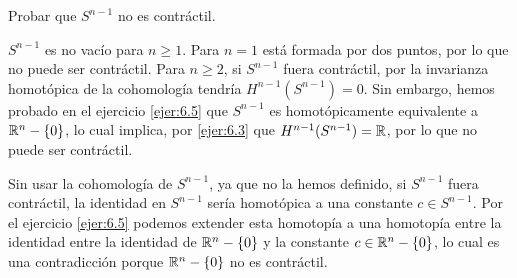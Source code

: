 \documentclass[twoside]{article}
\begin{document}
\begin{ejercicio}{6.6}
Probar que $S^{n-1}$ no es contráctil.
\end{ejercicio}
\begin{solucion}
$S^{n-1}$ es no vacío para $n\geq 1$. Para $n=1$ está formada por dos puntos, por lo que no puede ser contráctil. Para $n\geq 2$, si $S^{n-1}$ fuera contráctil, por la invarianza homotópica de la cohomología tendría $H^{n-1}(S^{n-1})=0$. Sin embargo, hemos probado en el ejercicio \ref{ejer:6.5} que $S^{n-1}$ es homotópicamente equivalente a $\mathbb{R}^n-\{0\}$, lo cual implica, por \ref{ejer:6.3} que $H^{n-1}(S^{n-1})=\mathbb{R}$, por lo que no puede ser contráctil.

Sin usar la cohomología de $S^{n-1}$, ya que no la hemos definido, si $S^{n-1}$ fuera contráctil, la identidad en $S^{n-1}$ sería homotópica a una constante $c\in S^{n-1}$. Por el ejercicio \ref{ejer:6.5} podemos extender esta homotopía a una homotopía entre la identidad  entre la identidad de $\mathbb{R}^n-\{0\}$ y la constante $c\in\mathbb{R}^n-\{0\}$, lo cual es una contradicción porque $\mathbb{R}^n-\{0\}$ no es contráctil.  
\end{solucion}
\end{document}
